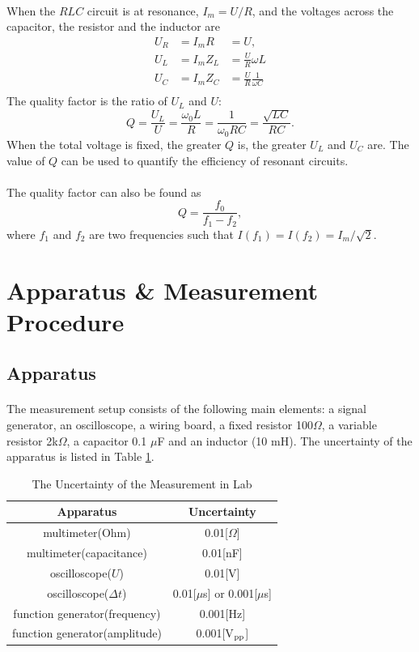 \documentclass{my_template}
\begin{document}
    \paragraph{} When the $RLC$ circuit is at resonance, $I_m=U/R$, and the voltages across the capacitor, the resistor and the inductor are
    \begin{eqnarray*}
        U_R&=I_mR&=U,\\
        U_L&=I_mZ_L&=\frac{U}{R}\omega L\\
        U_C&=I_mZ_C&=\frac{U}{R}\frac{1}{\omega C}\\
    \end{eqnarray*}
    The quality factor is the ratio of $U_L$ and $U$: $$Q=\frac{U_L}{U}=\frac{\omega_0L}{R}=\frac{1}{\omega_0RC}=\frac{\sqrt{LC}}{RC}.$$When the total voltage is fixed, the greater $Q$ is, the greater $U_L$ and $U_C$ are. The value of $Q$ can be used to quantify the efficiency of resonant circuits.
    \vspace{-5mm}
    \paragraph{}The quality factor can also be found as $$Q=\frac{f_0}{f_1-f_2},$$ where $f_1$ and $f_2$ are two frequencies such that $I(f_1)=I(f_2)=I_m/\sqrt{2}.$
    \section{Apparatus \& Measurement Procedure}
    \subsection{Apparatus}
    \paragraph{}The measurement setup consists of the following main elements: a signal generator, an oscilloscope, a wiring board, a fixed resistor 100$\Omega$, a variable resistor 2k$\Omega$, a capacitor 0.1 $\mu$F and an inductor (10 mH). The uncertainty of the apparatus is listed in Table \ref{tab:apparatus}. 
    \begin{table}[H]
        \centering
        \begin{tabular}{|c|c|}
            \hline
            Apparatus&Uncertainty\\\hline
            multimeter(Ohm)&0.01[$\Omega$]\\\hline
            multimeter(capacitance)&0.01[nF]\\\hline
            oscilloscope($U$)&0.01[V]\\\hline
            oscilloscope($\Delta t$)&0.01[$\mu$s] or 0.001[$\mu$s]\\\hline
            function generator(frequency)&0.001[Hz]\\\hline
            function generator(amplitude)&0.001[V$_{\rm pp}$]\\\hline
        \end{tabular}
        \caption{The Uncertainty of the Measurement in Lab}
        \label{tab:apparatus}
    \end{table}
\end{document}
